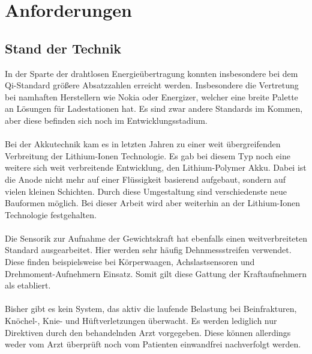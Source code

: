 \documentclass[12pt]{scrreprt} %
\begin{document}
\chapter{Anforderungen}
\section{Stand der Technik}
In der Sparte der drahtlosen Energieübertragung konnten insbesondere bei dem Qi-Standard größere Absatzzahlen erreicht werden. Insbesondere die Vertretung bei namhaften Herstellern wie Nokia \citep{NOKIA} oder Energizer\citep{ENERGIZER}, welcher eine breite Palette an Lösungen für Ladestationen hat. Es sind zwar andere Standards im Kommen, aber diese befinden sich noch im Entwicklungsstadium.\\
\\
Bei der Akkutechnik kam es in letzten Jahren zu einer weit übergreifenden Verbreitung der Lithium-Ionen Technologie. Es gab bei diesem Typ noch eine weitere sich weit verbreitende Entwicklung, den Lithium-Polymer Akku. Dabei ist die Anode nicht mehr auf einer Flüssigkeit basierend aufgebaut, sondern auf vielen kleinen Schichten. Durch diese Umgestaltung sind verschiedenste neue Bauformen möglich. Bei dieser Arbeit wird aber weiterhin an der Lithium-Ionen Technologie festgehalten.\\
\\
Die Sensorik zur Aufnahme der Gewichtskraft hat ebenfalls einen weitverbreiteten Standard ausgearbeitet. Hier werden sehr häufig Dehnmessstreifen verwendet. Diese finden beispielsweise bei Körperwaagen, Achslastsensoren und Drehmoment-Aufnehmern Einsatz. Somit gilt diese Gattung der Kraftaufnehmern als etabliert.\\
\\
Bisher gibt es kein System, das aktiv die laufende Belastung bei Beinfrakturen, Knöchel-, Knie- und Hüftverletzungen überwacht. Es werden lediglich nur Direktiven durch den behandelnden Arzt vorgegeben. Diese können allerdings weder vom Arzt überprüft noch vom Patienten einwandfrei nachverfolgt werden.
\end{document}
